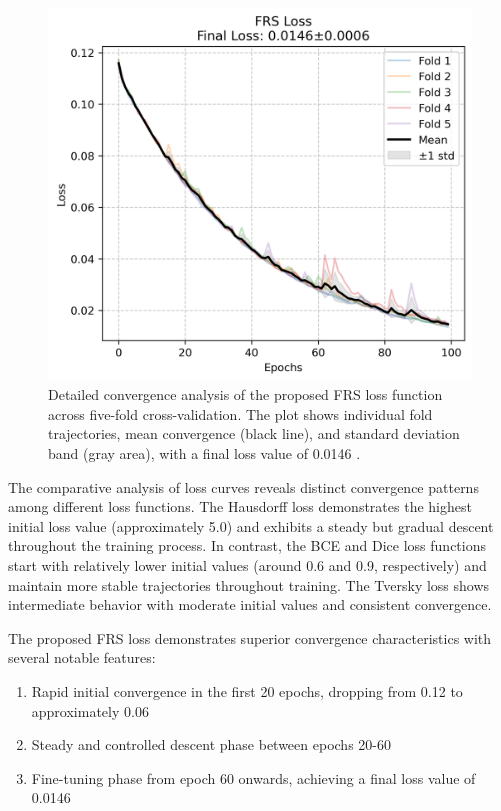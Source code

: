 \documentclass[review]{elsarticle}
\begin{document}
\begin{figure}[H]
    \centering
    \includegraphics[width=\textwidth]{FRS Loss.png}
    \caption{Detailed convergence analysis of the proposed FRS loss function across five-fold cross-validation. The plot shows individual fold trajectories, mean convergence (black line), and  standard deviation band (gray area), with a final loss value of 0.0146 .}
    \label{fig:frs_convergence}
\end{figure}
The comparative analysis of loss curves reveals distinct convergence patterns among different loss functions. The Hausdorff loss demonstrates the highest initial loss value (approximately 5.0) and exhibits a steady but gradual descent throughout the training process. In contrast, the BCE and Dice loss functions start with relatively lower initial values (around 0.6 and 0.9, respectively) and maintain more stable trajectories throughout training. The Tversky loss shows intermediate behavior with moderate initial values and consistent convergence.

The proposed FRS loss demonstrates superior convergence characteristics with several notable features:
\begin{enumerate}
    \item Rapid initial convergence in the first 20 epochs, dropping from 0.12 to approximately 0.06
    \item Steady and controlled descent phase between epochs 20-60
\item Fine-tuning phase from epoch 60 onwards, achieving a final loss value of 0.0146 
\end{enumerate}
\end{document}
